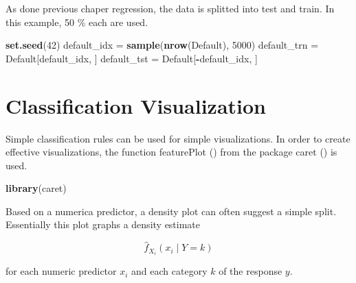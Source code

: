 \documentclass[]{report}
\newenvironment{Shaded}{\begin{snugshade}}{\end{snugshade}}
\newcommand{\KeywordTok}[1]{\textcolor[rgb]{0.13,0.29,0.53}{\textbf{#1}}}
\newcommand{\DataTypeTok}[1]{\textcolor[rgb]{0.13,0.29,0.53}{#1}}
\newcommand{\DecValTok}[1]{\textcolor[rgb]{0.00,0.00,0.81}{#1}}
\newcommand{\FloatTok}[1]{\textcolor[rgb]{0.00,0.00,0.81}{#1}}
\newcommand{\StringTok}[1]{\textcolor[rgb]{0.31,0.60,0.02}{#1}}
\newcommand{\OperatorTok}[1]{\textcolor[rgb]{0.81,0.36,0.00}{\textbf{#1}}}
\newcommand{\NormalTok}[1]{#1}
\begin{document}
As done previous chaper regression, the data is splitted into test and
train. In this example, 50 \% each are used.

\begin{Shaded}
\begin{Highlighting}[]
\KeywordTok{set.seed}\NormalTok{(}\DecValTok{42}\NormalTok{)}
\NormalTok{default_idx   =}\StringTok{ }\KeywordTok{sample}\NormalTok{(}\KeywordTok{nrow}\NormalTok{(Default), }\DecValTok{5000}\NormalTok{)}
\NormalTok{default_trn =}\StringTok{ }\NormalTok{Default[default_idx, ]}
\NormalTok{default_tst =}\StringTok{ }\NormalTok{Default[}\OperatorTok{-}\NormalTok{default_idx, ]}
\end{Highlighting}
\end{Shaded}

\section{Classification
Visualization}\label{classification-visualization}

Simple classification rules can be used for simple visualizations. In
order to create effective visualizations, the function featurePlot ()
from the package caret () is used.

\begin{Shaded}
\begin{Highlighting}[]
\KeywordTok{library}\NormalTok{(caret)}
\end{Highlighting}
\end{Shaded}

Based on a numerica predictor, a density plot can often suggest a simple
split. Essentially this plot graphs a density estimate

\[\hat{f}_{X_i}(x_i \mid Y = k)\]

for each numeric predictor \(x_i\) and each category \(k\) of the
response \(y\).

\begin{Shaded}
\end{Shaded}
\end{document}
